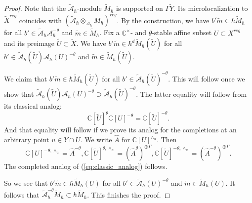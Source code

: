 \documentclass[12pt]{amsart}
\newcommand{\C}{\mathbb{C}}
\newcommand{\A}{\mathcal{A}}
\theoremstyle{definition}
\numberwithin{equation}{section}
\begin{document}
\begin{proof}
Note that the
$\tilde{\A}_\hbar$-module $\tilde{M}_\hbar$ is supported on $\Gamma\tilde{Y}$. Its
microlocalization to $\tilde{X}^{reg}$ coincides with $(\tilde{\A}_\hbar\otimes_{\A_\hbar}M_\hbar)^{reg}$.
By the construction, we have $b' \tilde{m}\in \hbar \tilde{M}_\hbar$ for all $b'\in \tilde{\A}_\hbar\A_\hbar^{-\theta}$
 and $\tilde{m}\in \tilde{M}_\hbar$. Fix a $\C^\times$- and  $\theta$-stable affine subset $U\subset X^{reg}$
 and its preimage $\tilde{U}\subset \tilde{X}$. We have $b'\tilde{m}\in \hbar^d\tilde{M}_\hbar(\tilde{U})$ for all $b'\in \tilde{\A}_\hbar(\tilde{U})\A_\hbar(U)^{-\theta}$
and $\tilde{m}\in \tilde{M}_\hbar(\tilde{U})$. 

We claim that $b'\tilde{m}\in \hbar\tilde{M}_\hbar(\tilde{U})$
for all $b'\in \tilde{\A}_\hbar(\tilde{U})^{-\theta}$. This will follow once we show that
$\tilde{\A}_\hbar(\tilde{U})\A_\hbar(U)^{-\theta}\supset\tilde{\A}_\hbar(\tilde{U})^{-\theta}$.
The latter equality will follow from its classical analog:
\begin{equation}\label{eq:classic_analog}\C[\tilde{U}]^\theta
\C[U]^{-\theta}=\C[\tilde{U}]^{-\theta}.
\end{equation}
 And that equality will follow if we prove its analog
for the completions at an arbitrary point $u\in Y\cap U$. We write $\hat{A}$ for
$\C[U]^{\wedge_u}$. Then $$\C[U]^{-\theta,\wedge_u}=\hat{A}^{-\theta},
\C[\tilde{U}]^{\theta,\wedge_u}=(\hat{A}^\theta)^{\oplus \Gamma},
\C[\tilde{U}]^{-\theta,\wedge_u}=(\hat{A}^{-\theta})^{\oplus \Gamma}.$$
The completed analog of (\ref{eq:classic_analog}) follows.

So we see that $b'\tilde{m}\in \hbar\tilde{M}_\hbar(U)$ for all $b'\in \tilde{\A}_\hbar(U)^{-\theta}$
and $\tilde{m}\in \tilde{M}_\hbar(U)$. It follows that $\tilde{\A}_\hbar^{-\theta} \tilde{M}_\hbar\subset \hbar \tilde{M}_\hbar$. This finishes the proof.
\end{proof}
\end{document}
